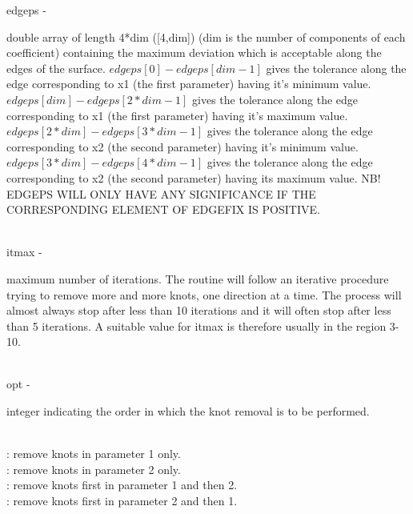         \>\>    {\fov edgeps}\> - \>  \begin{minipg2}
                     double array of length 4*dim ([4,dim]) (dim is
                        the number of components of each coefficient)
			 containing the maximum deviation which is
			 acceptable along the edges of the surface.
                         $edgeps[0]-edgeps[dim-1]$ gives the tolerance along
			 the edge corresponding to x1 (the first parameter)
 			 having it's minimum value.
			 $edgeps[dim]-edgeps[2*dim-1]$ gives the tolerance
			 along the edge corresponding to x1 (the first
			 parameter) having it's maximum value.
              		 $edgeps[2*dim]-edgeps[3*dim-1]$ gives the tolerance
			 along the edge corresponding to x2 (the second
			 parameter) having it's minimum value.
              		 $edgeps[3*dim]-edgeps[4*dim-1]$ gives the tolerance
			 along the edge corresponding to x2 (the second
			 parameter) having its maximum value.
           	 NB! EDGEPS WILL ONLY HAVE ANY SIGNIFICANCE IF THE
		     CORRESPONDING ELEMENT OF EDGEFIX IS POSITIVE.
                               \end{minipg2}\\[0.8ex]
        \>\>    {\fov itmax}\> - \>  \begin{minipg2}
                     maximum number of iterations. The routine will
                        follow an iterative procedure trying to remove
                        more and more knots, one direction at a time.
                        The process will almost always stop after less
                        than 10 iterations and it will often stop after
                        less than 5 iterations. A suitable value for itmax
                        is therefore usually in the region 3-10.
                               \end{minipg2}\\[0.8ex]
        \>\>    {\fov opt}\> - \>  \begin{minipg2}
                     integer indicating the order in which the
	       	         knot removal is to be performed.
                               \end{minipg2}\\[0.8ex]
          \>\>\> : remove knots in parameter 1 only.\\
          \>\>\> : remove knots in parameter 2 only.\\
          \>\>\> : remove knots first in parameter 1 and then 2.\\
          \>\>\> : remove knots first in parameter 2 and then 1.\\
